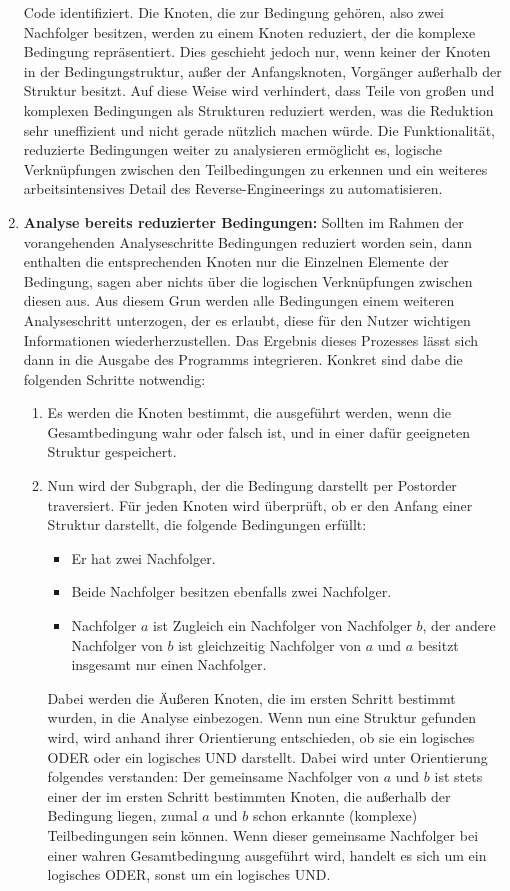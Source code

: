 \documentclass[11pt]{article}
\begin{document}
\begin{enumerate}
		Code identifiziert. Die Knoten, die zur Bedingung gehören, also zwei Nachfolger
		besitzen, werden zu einem Knoten reduziert, der die komplexe Bedingung repräsentiert.
		Dies geschieht jedoch nur, wenn keiner der Knoten in der Bedingungstruktur,
		außer der Anfangsknoten, Vorgänger außerhalb der Struktur besitzt.
		Auf diese Weise wird verhindert, dass Teile von großen und komplexen Bedingungen
		als Strukturen reduziert werden, was die Reduktion sehr uneffizient und nicht
		gerade nützlich machen würde. Die Funktionalität, reduzierte Bedingungen weiter
		zu analysieren ermöglicht es, logische Verknüpfungen zwischen den Teilbedingungen
		zu erkennen und ein weiteres arbeitsintensives Detail des Reverse-Engineerings
		zu automatisieren.
	\item{\textbf{Analyse bereits reduzierter Bedingungen:}}
		Sollten im Rahmen der vorangehenden Analyseschritte Bedingungen reduziert worden sein,
		dann enthalten die entsprechenden Knoten nur die Einzelnen Elemente der Bedingung,
		sagen aber nichts über die logischen Verknüpfungen zwischen diesen aus. Aus diesem
		Grun werden alle Bedingungen einem weiteren Analyseschritt unterzogen, der es erlaubt,
		diese für den Nutzer wichtigen Informationen wiederherzustellen. Das Ergebnis dieses
		Prozesses lässt sich dann in die Ausgabe des Programms integrieren. Konkret sind dabe
		die folgenden Schritte notwendig:
		\begin{enumerate}
			\item{Es werden die Knoten bestimmt, die ausgeführt werden, wenn die Gesamtbedingung
				wahr oder falsch ist, und in einer dafür geeigneten Struktur gespeichert.}
			\item{Nun wird der Subgraph, der die Bedingung darstellt per Postorder traversiert.
				Für jeden Knoten wird überprüft, ob er den Anfang einer Struktur darstellt,
				die folgende Bedingungen erfüllt:
				\begin{itemize}
					\item{Er hat zwei Nachfolger.}
					\item{Beide Nachfolger besitzen ebenfalls zwei Nachfolger.}
					\item{Nachfolger $a$ ist Zugleich ein Nachfolger von
						Nachfolger $b$, der andere Nachfolger von $b$ ist
						gleichzeitig Nachfolger von $a$ und $a$ besitzt insgesamt
					        nur einen Nachfolger.}
				\end{itemize}
				Dabei werden die Äußeren Knoten, die im ersten Schritt bestimmt wurden, in
				die Analyse einbezogen. Wenn nun eine Struktur gefunden wird, wird anhand
				ihrer Orientierung entschieden, ob sie ein logisches ODER oder ein logisches
				UND darstellt. Dabei wird unter Orientierung folgendes verstanden: Der
				gemeinsame Nachfolger von $a$ und $b$ ist stets einer der im ersten Schritt
				bestimmten Knoten, die außerhalb der Bedingung liegen, zumal $a$ und $b$
				schon erkannte (komplexe) Teilbedingungen sein können. Wenn dieser gemeinsame
				Nachfolger bei einer wahren Gesamtbedingung ausgeführt wird, handelt es sich
				um ein logisches ODER, sonst um ein logisches UND.
				
}
\end{enumerate}
\end{enumerate}
\end{document}
